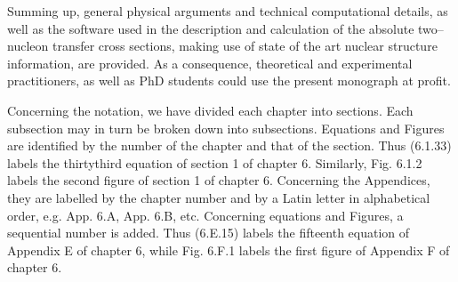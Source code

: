 \documentclass[a4paper,14pt]{book}
\begin{document}
Summing up, general physical arguments and technical computational details, as well as the software used in the description and calculation of the absolute two--nucleon transfer cross sections, making use of state of the art nuclear structure information, are provided. As a consequence, theoretical and experimental practitioners, as well as PhD students could use the present monograph at profit. 


Concerning the notation, we have divided each chapter into sections. Each subsection may in turn be broken down into subsections. Equations and Figures are identified by the number of the chapter and that of the section. Thus (6.1.33) labels the thirtythird equation of section 1 of chapter 6. Similarly, Fig. 6.1.2 labels the second figure of section 1 of chapter 6. Concerning the Appendices, they are labelled by the chapter number and by a Latin letter in alphabetical order, e.g. App. 6.A, App. 6.B, etc. Concerning equations and Figures, a sequential number is added. Thus (6.E.15) labels the fifteenth equation of Appendix E of chapter 6, while Fig. 6.F.1 labels the first figure of Appendix F of chapter 6.
\end{document}
